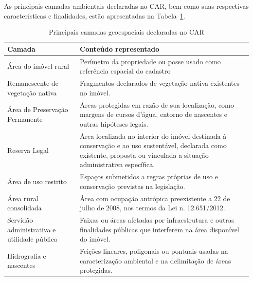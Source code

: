 As principais camadas ambientais declaradas no CAR, bem como suas respectivas características e finalidades, estão apresentadas na Tabela~\ref{tab:camadascar}.

\begin{table}[H]
\centering
\caption{Principais camadas geoespaciais declaradas no CAR}
\label{tab:camadascar}

\begingroup
\small
\SingleSpacing

\renewcommand{\arraystretch}{1.35}

\setlength{\tabcolsep}{8pt}

\begin{tabularx}{\textwidth}{
>{\RaggedRight\arraybackslash}p{4.1cm}
>{\arraybackslash}X
}
\toprule
\textbf{Camada} & \textbf{Conteúdo representado} \\
\midrule

Área do imóvel rural &
Perímetro da propriedade ou posse usado como referência espacial do cadastro \\

Remanescente de vegetação nativa &
Fragmentos declarados de vegetação nativa existentes no imóvel. \\

Área de Preservação Permanente &
Áreas protegidas em razão de sua localização, como margens de cursos d'água, entorno de nascentes e outras hipóteses legais. \\

Reserva Legal &
Área localizada no interior do imóvel destinada à conservação e ao uso sustentável, declarada como existente, proposta ou vinculada a situação administrativa específica. \\

Área de uso restrito &
Espaços submetidos a regras próprias de uso e conservação previstas na legislação. \\

Área rural consolidada &
Área com ocupação antrópica preexistente a 22 de julho de 2008, nos termos da Lei n. 12.651/2012. \\

Servidão administrativa e utilidade pública &
Faixas ou áreas afetadas por infraestrutura e outras finalidades públicas que interferem na área disponível do imóvel. \\

Hidrografia e nascentes &
Feições lineares, poligonais ou pontuais usadas na caracterização ambiental e na delimitação de áreas protegidas. \\

\bottomrule
\end{tabularx}

\vspace{0.25cm}

\endgroup
\end{table}

